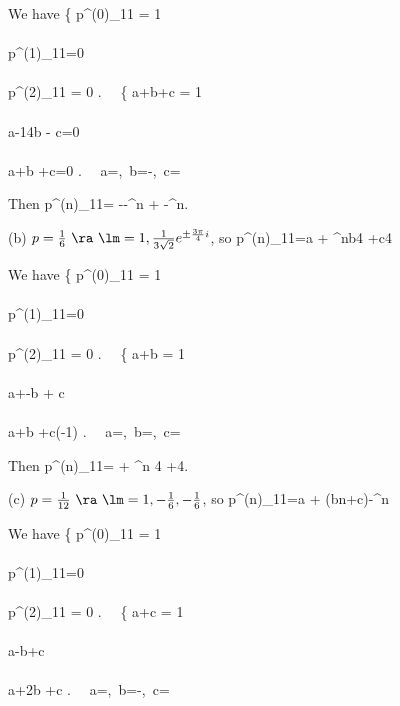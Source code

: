 We have
\be
\left\{
p^{(0)}_{11} = 1 \\
\\
p^{(1)}_{11}=0 \\
\\
p^{(2)}_{11} = 0
\ea\right.
\ \ra \
\left\{
a+b+c = 1 \\
\\
a-\frac 14b - c=0 \\
\\
a+b +c=0
\ea\right.
\ \ra \ a=,\ b=-,\ c=
\ee

Then
\be
p^{(n)}_{11}= -\lob-\rob^n +  \lob -\rob^n.
\ee

(b) $p=\frac{1}{6}\ \ra \ \lm = 1,\frac 1{3\sqrt{2}}e^{\pm\frac{3\pi}4i}$, so
\be
p^{(n)}_{11}=a + \lob{}\rob^n\lob b\cos{}4 +c\sin{}4\rob
\ee

We have
\be
\left\{
p^{(0)}_{11} = 1 \\
\\
p^{(1)}_{11}=0 \\
\\
p^{(2)}_{11} = 0
\ea\right.
\ \ra \
\left\{
a+b = 1 \\
\\
a+\lob -b + c \\
\\
a+\frac 1{18}\lob b\cdot 0 +c\cdot (-1)\rob=0
\ea\right.
\ \ra \ a=,\ b=,\ c=
\ee

Then
\be
p^{(n)}_{11}= + \lob {}\rob^n \lob {}\cos{}4 +\sin{}4\rob.
\ee

(c) $p=\frac{1}{12}\ \ra \ \lm = 1,-\frac 16, -\frac 16$, so
\be
p^{(n)}_{11}=a + (bn+c)\lob-\frac 1{6}\rob^n
\ee

We have
\be
\left\{
p^{(0)}_{11} = 1 \\
\\
p^{(1)}_{11}=0 \\
\\
p^{(2)}_{11} = 0
\ea\right.
\ \ra \
\left\{
a+c = 1 \\
\\
a-\lob b+c \\
\\
a+\lob 2b +c
\ea\right.
\ \ra \ a=,\ b=-,\ c=
\ee

